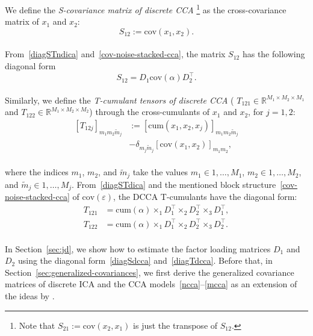 \documentclass{article}
\newcommand{\sbra}[1]{\left[#1\right]}
\newcommand{\R}{\mathbb{R}}
\newcommand{\cov}{\mathrm{cov}}
\newcommand{\cum}{\mathrm{cum}}
\begin{document}
 
We define the \emph{S-covariance matrix of discrete CCA}%
\footnote{ Note that $S_{21} := \cov(x_2,x_1)$ is just the transpose of $S_{12}$. 
}
as the cross-covariance matrix of $x_1$ and $x_2$:
\\[-1.1em]
\begin{equation}\label{Sdcca}
S_{12} := \cov(x_1,x_2).
\end{equation}
\\[-1.2em]
From~\eqref{diagSTndica} and~\eqref{cov-noise-stacked-cca}, the matrix $S_{12}$ has the following diagonal form
\\[-1.6em]
\begin{equation}\label{diagSdcca}
S_{12} = D_1 \cov(\alpha) D_2^{\top}.
\end{equation}
\\[-1.2em]
Similarly, we define the \emph{T-cumulant tensors of discrete CCA} (
$T_{121}\in\R^{M_1\times M_2\times M_1}$ and $T_{122}\in\R^{M_1\times M_2\times M_2}$) through the cross-cumulants of $x_1$ and $x_2$, for $j=1,2$:
\\[-1.3em]
\begin{equation}\label{Tdcca}
\begin{aligned}
\sbra{ T_{12j} }_{m_1m_2\tilde{m}_j} & := [\cum(x_1,x_2,x_j)]_{m_1m_2\tilde{m}_j} \\
& - \delta_{m_j\tilde{m}_j}[\cov(x_1,x_2)]_{m_1m_2},
\end{aligned}
\end{equation}
\\[-0.9em]
where the indices $m_1$, $m_2$, and $\tilde{m}_j$ take the values $m_1\in 1,\dots,M_1$, $m_2 \in 1,\dots,M_2$, and $\tilde{m}_j\in 1,\dots, M_j$.
From~\eqref{diagSTdica} and the mentioned block structure~\eqref{cov-noise-stacked-cca} of $\cov(\varepsilon)$, the DCCA T-cumulants have the diagonal form:
\\[-0.6em]
\begin{equation}\label{diagTdcca}
\begin{aligned}
T_{121} &= \cum(\alpha) \times_1 D_1^{\top} \times_2 D_2^{\top} \times_3 D_1^{\top}, \\
T_{122} &= \cum(\alpha) \times_1 D_1^{\top} \times_2 D_2^{\top} \times_3 D_2^{\top}.
\end{aligned}
\end{equation}
\\[-0.6em]
In Section~\ref{sec:jd}, we show how to estimate the factor loading matrices $D_1$ and $D_2$ using the diagonal form~\eqref{diagSdcca} and~\eqref{diagTdcca}.
Before that, in Section~\ref{sec:generalized-covariances}, we first derive the generalized covariance matrices of discrete ICA and the CCA models~\eqref{ncca}--\eqref{mcca}  as an extension of the ideas by \citet{Yer2000,TodHer2013}. 
\end{document}
